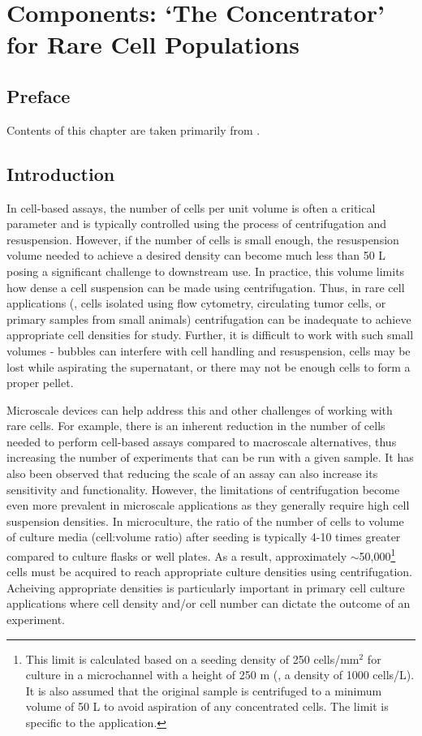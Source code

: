 \chapter{Components: `The Concentrator' for Rare Cell Populations}
\label{Chap:Concentrator}

\section{Preface}
Contents of this chapter are taken primarily from \cite{Warrick:2010fk}.

\section{Introduction}
In cell-based assays, the number of cells per unit volume is often a critical parameter and is typically controlled using the process of centrifugation and resuspension. However, if the number of cells is small enough, the resuspension volume needed to achieve a desired density can become much less than 50 \textmu L posing a significant challenge to downstream use.  In practice, this volume limits how dense a cell suspension can be made using centrifugation. Thus, in rare cell applications (\eg , cells isolated using flow cytometry, circulating tumor cells, or primary samples from small animals) centrifugation can be inadequate to achieve appropriate cell densities for study. Further, it is difficult to work with such small volumes - bubbles can interfere with cell handling and resuspension, cells may be lost while aspirating the supernatant, or there may not be enough cells to form a proper pellet. 

Microscale devices can help address this and other challenges of working with rare cells. For example, there is an inherent reduction in the number of cells needed to perform cell-based assays compared to macroscale alternatives, thus increasing the number of experiments that can be run with a given sample. It has also been observed that reducing the scale of an assay can also increase its sensitivity and functionality\cite{Chen:2005ys,Walker:2004gs,Breslauer:2006nx,Domenech:2009jt}.  However, the limitations of centrifugation become even more prevalent in microscale applications as they generally require high cell suspension densities. In microculture, the ratio of the number of cells to volume of culture media (cell:volume ratio) after seeding is typically 4-10 times greater compared to culture flasks or well plates\cite{Paguirigan:2009bh}. As a result, approximately $\sim$50,000\footnote{This limit is calculated based on a seeding density of 250 cells/mm$^{2}$ for culture in a microchannel with a height of 250 \textmu m (\ie , a density of 1000 cells/\textmu L). It is also assumed that the original sample is centrifuged to a minimum volume of 50 \textmu L to avoid aspiration of any concentrated cells. The limit is specific to the application.\label{fn:thresh}} cells must be acquired to reach appropriate culture densities using centrifugation. Acheiving appropriate densities is particularly important in primary cell culture applications where cell density and\slash or cell number can dictate the outcome of an experiment\cite{Domenech:2009jt}.

